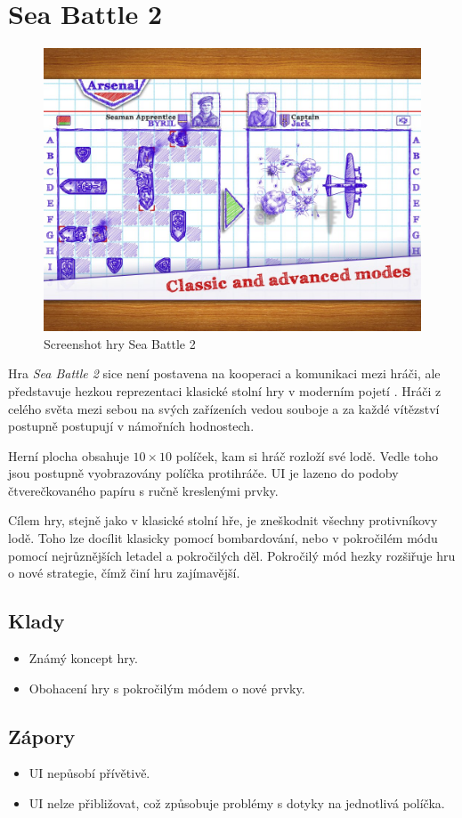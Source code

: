 \section{Sea Battle 2}

\begin{figure}[h!]
    \centering
    \includegraphics[width=0.5\linewidth]{assets/competitive-apps/sea-battle.jpg}
    \caption{Screenshot hry Sea Battle 2 \cite{byril_sea_battle_2}}
    \label{fig:sea-battle}
\end{figure}

Hra \emph{Sea Battle 2} sice není postavena na kooperaci a komunikaci mezi
hráči,
ale představuje hezkou reprezentaci klasické stolní hry v moderním pojetí
\cite{byril_sea_battle_2}.
Hráči z celého světa mezi sebou na svých zařízeních vedou souboje
a za každé vítězství postupně postupují v námořních hodnostech.

Herní plocha obsahuje $10 \times 10$ políček,
kam si hráč rozloží své lodě.
Vedle toho jsou postupně vyobrazovány políčka protihráče.
UI je lazeno do podoby čtverečkovaného papíru s ručně kreslenými prvky.

Cílem hry, stejně jako v klasické stolní hře,
je zneškodnit všechny protivníkovy lodě.
Toho lze docílit klasicky pomocí bombardování,
nebo v pokročilém módu pomocí nejrůznějších letadel a pokročilých děl.
Pokročilý mód hezky rozšiřuje hru o nové strategie,
čímž činí hru zajímavější.

\subsection*{Klady}

\begin{itemize}
    \item Známý koncept hry.
    \item Obohacení hry s pokročilým módem o nové prvky.
\end{itemize}

\subsection*{Zápory}

\begin{itemize}
    \item UI nepůsobí přívětivě.
    \item UI nelze přibližovat,
což způsobuje problémy s dotyky na jednotlivá políčka.
\end{itemize}
